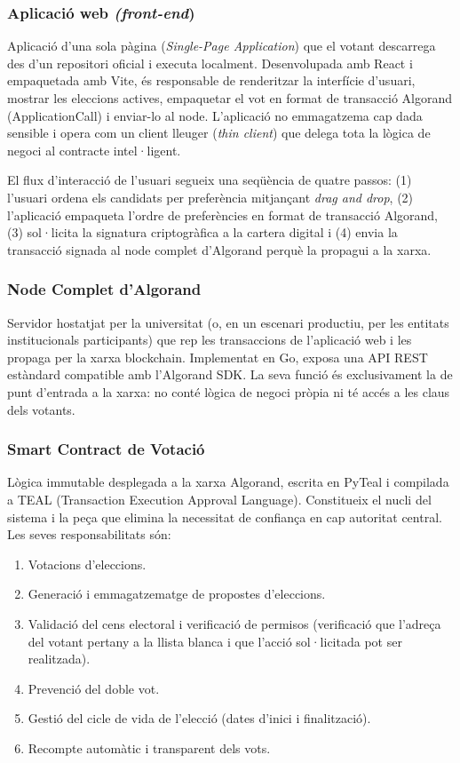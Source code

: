 \subsubsection{Aplicació web \textit{(\textit{front-end}})}
 
Aplicació d'una sola pàgina (\textit{Single-Page Application}) que el votant descarrega des d'un repositori oficial i executa localment. Desenvolupada amb React i empaquetada amb Vite, és responsable de renderitzar la interfície d'usuari, mostrar les eleccions actives, empaquetar el vot en format de transacció Algorand (ApplicationCall) i enviar-lo al node. L'aplicació no emmagatzema cap dada sensible i opera com un client lleuger (\textit{thin client}) que delega tota la lògica de negoci al contracte intel·ligent.
 
El flux d'interacció de l'usuari segueix una seqüència de quatre passos: (1) l'usuari ordena els candidats per preferència mitjançant \textit{drag and drop}, (2) l'aplicació empaqueta l'ordre de preferències en format de transacció Algorand, (3) sol·licita la signatura criptogràfica a la cartera digital i (4) envia la transacció signada al node complet d'Algorand perquè la propagui a la xarxa.

 
\subsubsection{Node Complet d'Algorand}
 
Servidor hostatjat per la universitat (o, en un escenari productiu, per les entitats institucionals participants) que rep les transaccions de l'aplicació web i les propaga per la xarxa blockchain. Implementat en Go, exposa una API REST estàndard compatible amb l'Algorand SDK. La seva funció és exclusivament la de punt d'entrada a la xarxa: no conté lògica de negoci pròpia ni té accés a les claus dels votants.
 
 
\subsubsection{Smart Contract de Votació}
 
Lògica immutable desplegada a la xarxa Algorand, escrita en PyTeal i compilada a TEAL (Transaction Execution Approval Language). Constitueix el nucli del sistema i la peça que elimina la necessitat de confiança en cap autoritat central. Les seves responsabilitats són:
 
\begin{enumerate}[label=\roman*.]
    \item Votacions d'eleccions.
    \item Generació i emmagatzematge de propostes d'eleccions.
    \item Validació del cens electoral i verificació de permisos (verificació que l'adreça del votant pertany a la llista blanca i que l'acció sol·licitada pot ser realitzada).
    \item Prevenció del doble vot.
    \item Gestió del cicle de vida de l'elecció (dates d'inici i finalització).
    \item Recompte automàtic i transparent dels vots.
\end{enumerate}
 
